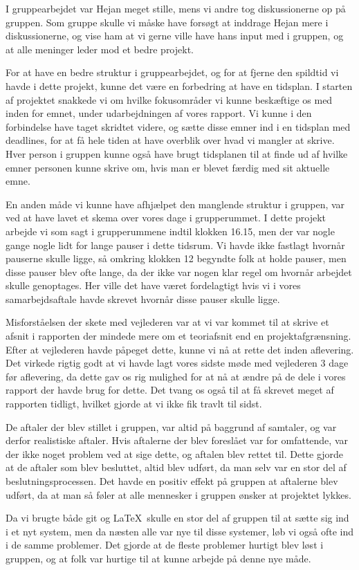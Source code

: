 I gruppearbejdet var Hejan meget stille, mens vi andre tog diskussionerne op på gruppen. Som gruppe skulle vi måske have forsøgt at inddrage Hejan mere i diskussionerne, og vise ham at vi gerne ville have hans input med i gruppen, og at alle meninger leder mod et bedre projekt.

For at have en bedre struktur i gruppearbejdet, og for at fjerne den spildtid vi havde i dette projekt, kunne det være en forbedring at have en tidsplan. I starten af projektet snakkede vi om hvilke fokusområder vi kunne beskæftige os med inden for emnet, under udarbejdningen af vores rapport. Vi kunne i den forbindelse have taget skridtet videre, og sætte disse emner ind i en tidsplan med deadlines, for at få hele tiden at have overblik over hvad vi mangler at skrive. Hver person i gruppen kunne også have brugt tidsplanen til at finde ud af hvilke emner personen kunne skrive om, hvis man er blevet færdig med sit aktuelle emne.

En anden måde vi kunne have afhjælpet den manglende struktur i gruppen, var ved at have lavet et skema over vores dage i grupperummet. I dette projekt arbejde vi som sagt i grupperummene indtil klokken 16.15, men der var nogle gange nogle lidt for lange pauser i dette tidsrum. Vi havde ikke fastlagt hvornår pauserne skulle ligge, så omkring klokken 12 begyndte folk at holde pauser, men disse pauser blev ofte lange, da der ikke var nogen klar regel om hvornår arbejdet skulle genoptages. Her ville det have været fordelagtigt hvis vi i vores samarbejdsaftale havde skrevet hvornår disse pauser skulle ligge.

Misforståelsen der skete med vejlederen var at vi var kommet til at skrive et afsnit i rapporten der mindede mere om et teoriafsnit end en projektafgrænsning. Efter at vejlederen havde påpeget dette, kunne vi nå at rette det inden aflevering. Det virkede rigtig godt at vi havde lagt vores sidste møde med vejlederen 3 dage før aflevering, da dette gav os rig mulighed for at nå at ændre på de dele i vores rapport der havde brug for dette. Det tvang os også til at få skrevet meget af rapporten tidligt, hvilket gjorde at vi ikke fik travlt til sidst.

De aftaler der blev stillet i gruppen, var altid på baggrund af samtaler, og var derfor realistiske aftaler. Hvis aftalerne der blev foreslået var for omfattende, var der ikke noget problem ved at sige dette, og aftalen blev rettet til. Dette gjorde at de aftaler som blev besluttet, altid blev udført, da man selv var en stor del af beslutningsprocessen. Det havde en positiv effekt på gruppen at aftalerne blev udført, da at man så føler at alle mennesker i gruppen ønsker at projektet lykkes.

Da vi brugte både git og \LaTeX\ skulle en stor del af gruppen til at sætte sig ind i et nyt system, men da næsten alle var nye til disse systemer, løb vi også ofte ind i de samme problemer. Det gjorde at de fleste problemer hurtigt blev løst i gruppen, og at folk var hurtige til at kunne arbejde på denne nye måde.